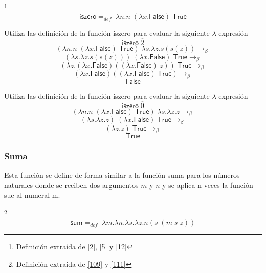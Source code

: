 	\begin{definition}\footnote{Definición extraída de \hyperlink{2}{[2]},  \hyperlink{5}{[5]} y \hyperlink{12}{[12]}}
            $$\textsf{iszero} =_{def}  \; \lambda n. n\;(\lambda x.\textsf{False}) \;\textsf{True}$$
        \end{definition}
        \begin{exercise}
            Utiliza las definición de la función \textsf{iszero} para evaluar la siguiente $\lambda$-expresión
            \[
                \textsf{iszero}  \; \overline{2}
            \]
            \[
                (\lambda n. n\;(\lambda x.\textsf{False})\;\textsf{True}) \; \lambda s.\lambda z.s(s(z)) \rightarrow_\beta 
            \]
		\[
			(\lambda s.\lambda z.s(s(z))) \; (\lambda x.\textsf{False}) \; \textsf{True}  \rightarrow_\beta 
		\]
		\[
			(\lambda z.(\lambda x.\textsf{False})((\lambda x.\textsf{False})\:z))\; \textsf{True}  \rightarrow_\beta 
		\]
		\[
			(\lambda x.\textsf{False}) ((\lambda x.\textsf{False})\:\textsf{True})  \rightarrow_\beta 
		\]
		\[
			 \textsf{False}
		\]
            

        \end{exercise}

        \begin{exercise}
            Utiliza las definición de la función \textsf{iszero} para evaluar la siguiente $\lambda$-expresión
            \[
                \textsf{iszero} \; \overline{0}
            \]
            \[
                (\lambda n. n \; (\lambda x.\textsf{False}) \; \textsf{True}) \; \lambda s.\lambda z.z \rightarrow_\beta 
            \]
		\[
			(\lambda s. \lambda z.z) \; (\lambda x.\textsf{False}) \; \textsf{True} \rightarrow_\beta 
		\]
		\[
			(\lambda z.z) \; \textsf{True} \rightarrow_\beta 
		\]
		\[
			\textsf{True}
		\]
        \end{exercise}
        
    \subsubsection{Suma}
        Esta función se define de forma similar a la función suma para los números naturales  donde se reciben dos argumentos $m$ y $n$ y se aplica n veces la función \textsf{suc} al numeral m.

        \begin{definition}\footnote{Definición extraída de \hyperlink{109}{[109]} y  \hyperlink{111}{[111]}}
            $$\textsf{sum} =_{def}  \; \lambda m.\lambda n.\lambda s.\lambda z.n(s \; (m \; s \; z))$$
        \end{definition}

